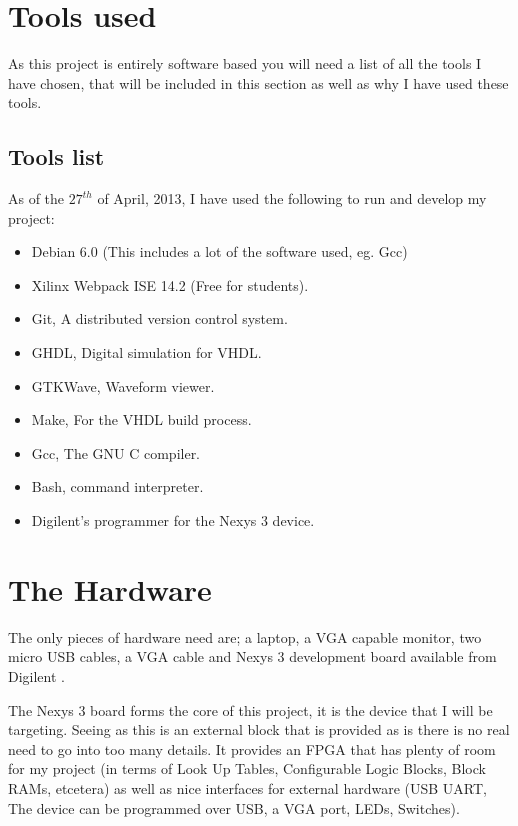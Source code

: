\documentclass	[a4paper, 10pt]	{article}
\begin{document}
  \section{Tools used}
  
  As this project is entirely software based you will need a list of all the tools
  I have chosen, that will be included in this section as well as why I have used
  these tools.

    \subsection{Tools list}

    As of the $27^{th}$ of April, 2013, I have used the following to run and develop
    my project:

    \begin{itemize}
      \item Debian 6.0 (This includes a lot of the software used, eg. Gcc)
      \item Xilinx Webpack ISE 14.2 (Free for students).
      \item Git, A distributed version control system.
      \item GHDL, Digital simulation for VHDL.
      \item GTKWave, Waveform viewer.
      \item Make, For the VHDL build process.
      \item Gcc, The GNU C compiler.
      \item Bash, command interpreter.
      \item Digilent's programmer for the Nexys 3 device.
    \end{itemize}


  \section{The Hardware}

  The only pieces of hardware need are; a laptop, a VGA capable monitor, two micro USB cables,
  a VGA cable and Nexys 3 development board available from Digilent \cite{nexysDigilent}.

  The Nexys 3 board forms the core of this project, it is the device that I will be targeting.
  Seeing as this is an external block that is provided as is there is no real need to go into
  too many details. It provides an FPGA that has plenty of room for my project (in terms of
  Look Up Tables, Configurable Logic Blocks, Block RAMs, etcetera) as well as nice interfaces
  for external hardware (USB UART, The device can be programmed over USB, a VGA port, LEDs,
  Switches).
\end{document}
